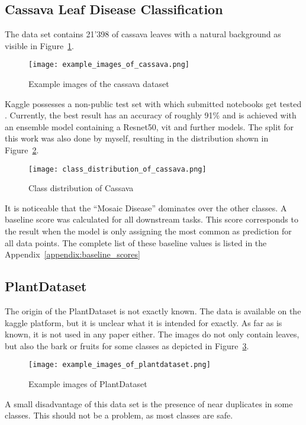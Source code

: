 \subsection{Cassava Leaf Disease Classification}
The data set contains 21'398 of cassava leaves with a natural background as visible in Figure~\ref{fig:example_images_of_cassava}.
\begin{figure}[H]
    \begin{center}
    \texttt{[image: example\_images\_of\_cassava.png]}
    \caption{Example images of the cassava dataset}\label{fig:example_images_of_cassava}
    \end{center}
\end{figure}
Kaggle possesses a non-public test set with which submitted notebooks get tested \autocite{mwebaze2020}. 
Currently, the best result has an accuracy of roughly 91\% and is achieved with an ensemble model containing a Resnet50, \gls{vit} and further models.  
The split for this work was also done by myself, resulting in the distribution shown in Figure~\ref{fig:class_distribution_of_cassava}.
\begin{figure}[H]
    \begin{center}
    \texttt{[image: class\_distribution\_of\_cassava.png]}
    \caption{Class distribution of Cassava}\label{fig:class_distribution_of_cassava}
    \end{center}
\end{figure}
It is noticeable that the ``Mosaic Disease'' dominates over the other classes. 
A baseline score was calculated for all downstream tasks. 
This score corresponds to the result when the model is only assigning the most common as prediction for all data points. 
The complete list of these baseline values is listed in the Appendix~\ref{appendix:baseline_scores}

\subsection{PlantDataset}
The origin of the PlantDataset is not exactly known. The data is available on the kaggle platform, but it is unclear what it is intended for exactly. 
As far as is known, it is not used in any paper either.
The images do not only contain leaves, but also the bark or fruits for some classes as depicted in Figure~\ref{fig:example_images_of_plantdataset}.
\begin{figure}[H]
    \begin{center}
    \texttt{[image: example\_images\_of\_plantdataset.png]}
    \caption{Example images of PlantDataset}\label{fig:example_images_of_plantdataset}
    \end{center}
\end{figure}
A small disadvantage of this data set is the presence of near duplicates in some classes. This should not be a problem, as most classes are safe.

